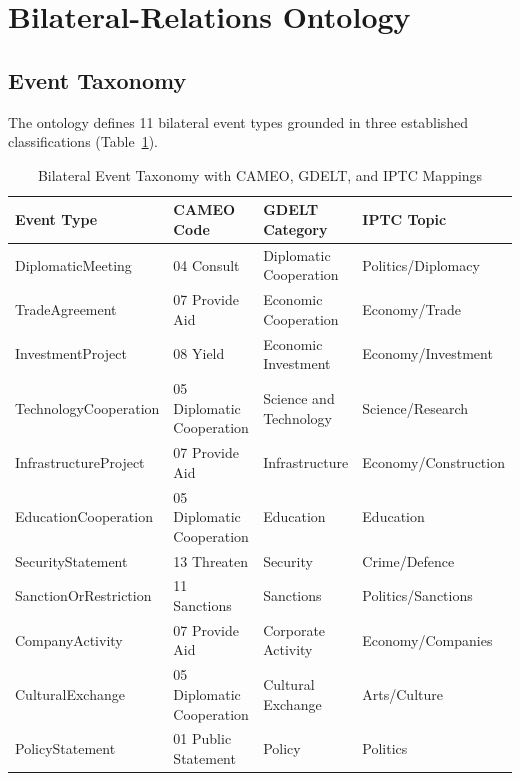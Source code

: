 \documentclass[conference]{IEEEtran}
\begin{document}
\section{Bilateral-Relations Ontology}
\label{sec:ontology}

\subsection{Event Taxonomy}

The ontology defines 11 bilateral event types grounded in three established
classifications (Table~\ref{tab:taxonomy}).

\begin{table}[htbp]
\caption{Bilateral Event Taxonomy with CAMEO, GDELT, and IPTC Mappings}
\label{tab:taxonomy}
\centering
\small
\begin{tabular}{p{3.2cm}p{3.0cm}p{3.2cm}p{4.2cm}}
\toprule
\textbf{Event Type} & \textbf{CAMEO Code} & \textbf{GDELT Category}
  & \textbf{IPTC Topic} \\
\midrule
DiplomaticMeeting      & 04 Consult                           & Diplomatic Cooperation    & Politics/Diplomacy \\
TradeAgreement         & 07 Provide Aid                       & Economic Cooperation      & Economy/Trade \\
InvestmentProject      & 08 Yield                             & Economic Investment       & Economy/Investment \\
TechnologyCooperation  & 05 Diplomatic Cooperation            & Science and Technology    & Science/Research \\
InfrastructureProject  & 07 Provide Aid                       & Infrastructure            & Economy/Construction \\
EducationCooperation   & 05 Diplomatic Cooperation            & Education                 & Education \\
SecurityStatement      & 13 Threaten                          & Security                  & Crime/Defence \\
SanctionOrRestriction  & 11 Sanctions                         & Sanctions                 & Politics/Sanctions \\
CompanyActivity        & 07 Provide Aid                       & Corporate Activity        & Economy/Companies \\
CulturalExchange       & 05 Diplomatic Cooperation            & Cultural Exchange         & Arts/Culture \\
PolicyStatement        & 01 Public Statement                  & Policy                    & Politics \\
\bottomrule
\end{tabular}
\end{table}
\end{document}
